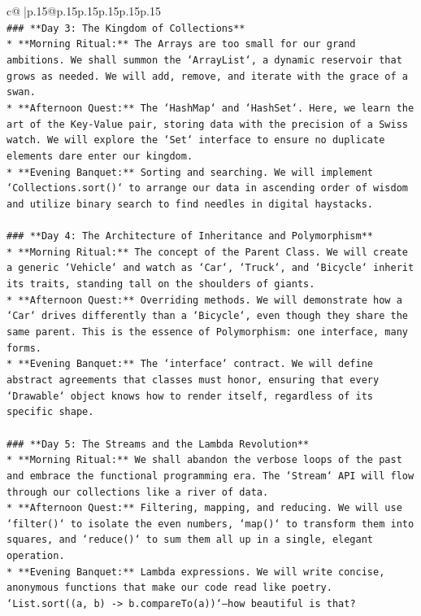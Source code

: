 \documentclass{article}
\begin{document}
{\begin{supertabular}{c@{$\;$}|p{.15\linewidth}@{}p{.15\linewidth}p{.15\linewidth}p{.15\linewidth}p{.15\linewidth}p{.15\linewidth}}
{{{\\ 
\texttt{\#\#\# **Day 3: The Kingdom of Collections**} \\
\texttt{*   **Morning Ritual:** The Arrays are too small for our grand ambitions. We shall summon the `ArrayList`, a dynamic reservoir that grows as needed. We will add, remove, and iterate with the grace of a swan.} \\
\texttt{*   **Afternoon Quest:** The `HashMap` and `HashSet`. Here, we learn the art of the Key{-}Value pair, storing data with the precision of a Swiss watch. We will explore the `Set` interface to ensure no duplicate elements dare enter our kingdom.} \\
\texttt{*   **Evening Banquet:** Sorting and searching. We will implement `Collections.sort()` to arrange our data in ascending order of wisdom and utilize binary search to find needles in digital haystacks.} \\
\\ 
\texttt{\#\#\# **Day 4: The Architecture of Inheritance and Polymorphism**} \\
\texttt{*   **Morning Ritual:** The concept of the Parent Class. We will create a generic `Vehicle` and watch as `Car`, `Truck`, and `Bicycle` inherit its traits, standing tall on the shoulders of giants.} \\
\texttt{*   **Afternoon Quest:** Overriding methods. We will demonstrate how a `Car` drives differently than a `Bicycle`, even though they share the same parent. This is the essence of Polymorphism: one interface, many forms.} \\
\texttt{*   **Evening Banquet:** The `interface` contract. We will define abstract agreements that classes must honor, ensuring that every `Drawable` object knows how to render itself, regardless of its specific shape.} \\
\\ 
\texttt{\#\#\# **Day 5: The Streams and the Lambda Revolution**} \\
\texttt{*   **Morning Ritual:** We shall abandon the verbose loops of the past and embrace the functional programming era. The `Stream` API will flow through our collections like a river of data.} \\
\texttt{*   **Afternoon Quest:** Filtering, mapping, and reducing. We will use `filter()` to isolate the even numbers, `map()` to transform them into squares, and `reduce()` to sum them all up in a single, elegant operation.} \\
\texttt{*   **Evening Banquet:** Lambda expressions. We will write concise, anonymous functions that make our code read like poetry. `List.sort((a, b) {-}> b.compareTo(a))`—how beautiful is that?} \\
}}}
\end{supertabular}}
\end{document}
